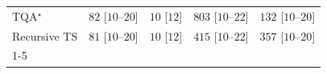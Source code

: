 \begin{tabular}{l|cccc|}
TQA$^\star$ & {\cellcolor[HTML]{EAF7E6}} \color[HTML]{000000} $82$ [$10$--$20$] & {\cellcolor[HTML]{F7FCF5}} \color[HTML]{000000} $10$ [$12$] & {\cellcolor[HTML]{00441B}} \color[HTML]{F1F1F1} $803$ [$10$--$22$] & {\cellcolor[HTML]{DEF2D9}} \color[HTML]{000000} $132$ [$10$--$20$] \\
Recursive TS & {\cellcolor[HTML]{EBF7E7}} \color[HTML]{000000} $81$ [$10$--$20$] & {\cellcolor[HTML]{F7FCF5}} \color[HTML]{000000} $10$ [$12$] & {\cellcolor[HTML]{70C274}} \color[HTML]{000000} $415$ [$10$--$22$] & {\cellcolor[HTML]{8ACE88}} \color[HTML]{000000} $357$ [$10$--$20$] \\
\cline{1-5}
\bottomrule
\end{tabular}
